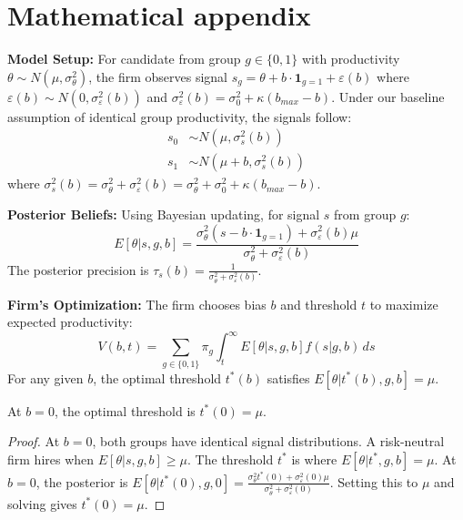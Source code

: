 \appendix
\clearpage
\section{Mathematical appendix}

\textbf{Model Setup:} For candidate from group $g \in \{0,1\}$ with productivity $\theta \sim N(\mu, \sigma_\theta^2)$, the firm observes signal $s_g = \theta + b \cdot \mathbf{1}_{g=1} + \varepsilon(b)$ where $\varepsilon(b) \sim N(0, \sigma_\varepsilon^2(b))$ and $\sigma_\varepsilon^2(b) = \sigma_0^2 + \kappa(b_{max} - b)$. Under our baseline assumption of identical group productivity, the signals follow:
\begin{align}
s_0 &\sim N(\mu, \sigma_s^2(b)) \\
s_1 &\sim N(\mu + b, \sigma_s^2(b))
\end{align}
where $\sigma_s^2(b) = \sigma_\theta^2 + \sigma_\varepsilon^2(b) = \sigma_\theta^2 + \sigma_0^2 + \kappa(b_{max} - b)$.

\textbf{Posterior Beliefs:} Using Bayesian updating, for signal $s$ from group $g$:
\begin{equation}
E[\theta | s, g, b] = \frac{\sigma_\theta^2 (s - b \cdot \mathbf{1}_{g=1}) + \sigma_\varepsilon^2(b) \mu}{\sigma_\theta^2 + \sigma_\varepsilon^2(b)} \label{eq:posterior}
\end{equation}
The posterior precision is $\tau_s(b) = \frac{1}{\sigma_\theta^2 + \sigma_\varepsilon^2(b)}$.

\textbf{Firm's Optimization:} The firm chooses bias $b$ and threshold $t$ to maximize expected productivity:
\begin{equation}
V(b,t) = \sum_{g \in \{0,1\}} \pi_g \int_t^\infty E[\theta | s, g, b] f(s|g,b) \, ds \label{eq:value_function}
\end{equation}
For any given $b$, the optimal threshold $t^*(b)$ satisfies $E[\theta | t^*(b), g, b] = \mu$.

\begin{lemma}
At $b = 0$, the optimal threshold is $t^*(0) = \mu$.
\end{lemma}
\begin{proof}
At $b = 0$, both groups have identical signal distributions. A risk-neutral firm hires when $E[\theta|s,g,b] \geq \mu$. The threshold $t^*$ is where $E[\theta|t^*, g, b] = \mu$.
At $b=0$, the posterior is $E[\theta | t^*(0), g, 0] = \frac{\sigma_\theta^2 t^*(0) + \sigma_\varepsilon^2(0) \mu}{\sigma_\theta^2 + \sigma_\varepsilon^2(0)}$. Setting this to $\mu$ and solving gives $t^*(0)=\mu$.
\end{proof}

